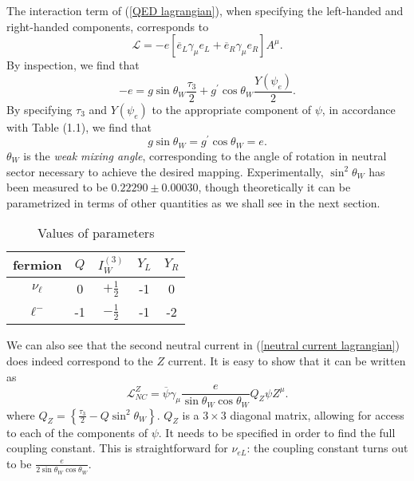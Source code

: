 \documentclass[10pt,a4paper]{book}
\begin{document}
The interaction term of (\ref{QED lagrangian}), when specifying the left-handed and right-handed components, corresponds to
\begin{equation}
\mathcal{L} = -e\left[ \overline{e}_L\gamma_\mu e_L + \overline{e}_R\gamma_\mu e_R
\right]A^\mu.
\end{equation} 
By inspection, we find that
\begin{equation}
-e = g\sin\theta_W \frac{\tau_3}{2} + g^\prime \cos\theta_W \frac{Y(\psi_{e})}{2}.
\end{equation}
By specifying $\tau_3$ and $Y(\psi_e)$ to the appropriate component of $\psi$, in accordance with Table (1.1), we find that
\begin{equation}
g\sin\theta_W = g^\prime \cos\theta_W = e.
\end{equation}
$\theta_W$ is the \emph{weak mixing angle}, corresponding to the angle of rotation in neutral sector necessary to achieve the desired mapping. Experimentally, $\sin^2\theta_W$ has been measured to be $0.22290 \pm 0.00030$, though theoretically it can be parametrized in terms of other quantities as we shall see in the next section.


\begin{table} 
\begin{center}
\begin{tabular}{ccccc}
\hline 
fermion & $Q$ & $I^{(3)}_W$ & $Y_L$ & $Y_R$ \\ 
\hline 
$\nu_\ell$ & 0 & $+\frac{1}{2}$ & -1 & 0 \\ 
$\ell^-$ & -1 & $-\frac{1}{2}$ & -1 & -2 \\ 
\end{tabular}
\caption{Values of parameters}
\end{center}
\end{table}

We can also see that the second neutral current in (\ref{neutral current lagrangian}) does indeed correspond to the $Z$ current. It is easy to show that it can be written as
\begin{equation}
\label{NC - Z}
\mathcal{L}_{NC}^{Z} = \overline{\psi}\gamma_\mu \frac{e}{\sin\theta_W \cos\theta_W} Q_Z \psi Z^\mu.
\end{equation}
where $Q_Z = \left\lbrace \frac{\tau_3}{2} - Q\sin^2\theta_W \right\rbrace$. $Q_Z$ is a $3\times 3$ diagonal matrix, allowing for access to each of the components of $\psi$. It needs to be specified in order to find the full coupling constant. This is straightforward for $\nu_{eL}$: the coupling constant turns out to be $\frac{e}{2\sin\theta_W\cos\theta_W}$. 
\end{document}
